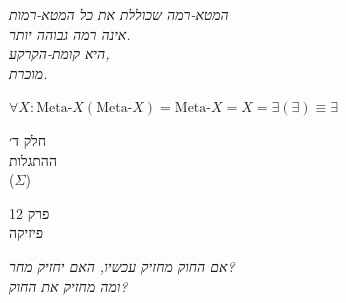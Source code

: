 \documentclass[10pt, openany, oneside]{book}
\renewcommand{\normalsize}{\fontsize{10}{13}\selectfont}
\renewcommand{\large}{\fontsize{11.5}{14}\selectfont}
\renewcommand{\LARGE}{\fontsize{15}{18}\selectfont}
\renewcommand{\huge}{\fontsize{17}{21}\selectfont}
\begin{document}
\vspace{0.5em}

\begin{center}
    \textit{%
    המטא-רמה שכוללת את כל המטא-רמות\\
    אינה רמה גבוהה יותר.}\\[0.8em]
    \textit{היא קומת-הקרקע,\\
    מוכרת.}
\end{center}

\vspace{0.5em}

\begin{center}
    $\forall X: \text{Meta-}X(\text{Meta-}X) = \text{Meta-}X = X = \exists(\exists) \equiv \exists$
\end{center}

%
%

\newpage
\thispagestyle{empty}
\vspace*{\fill}
\begin{center}
    {\LARGE\textsc{חלק ד׳}}\\[1em]
    {\large\textsc{ההתגלות}}\\[0.5em]
    {\normalsize ($\Sigma$)}
\end{center}
\vspace*{\fill}
\newpage

%
%
%

\newpage

\begin{center}
    {\huge\textsc{פרק 12}}\\[0.3em]
    {\large\textsc{פיזיקה}}
\end{center}

\vspace{1.5em}

\begin{center}
    \textit{%
    אם החוק מחזיק עכשיו, האם יחזיק מחר?\\
    ומה מחזיק את החוק?}
\end{center}

\vspace{2em}
\end{document}
